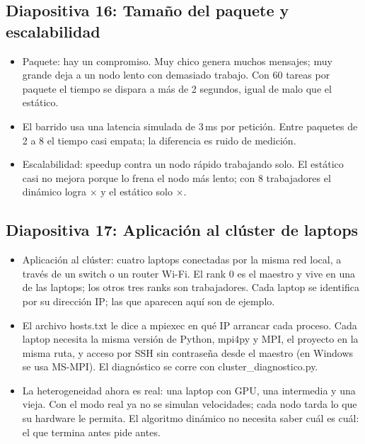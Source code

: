 \documentclass[11pt,a4paper]{article}
\begin{document}
\subsection*{Diapositiva 16: Tamaño del paquete y escalabilidad}
\begin{itemize}
  \item Paquete: hay un compromiso. Muy chico genera muchos mensajes; muy grande deja a un nodo lento con demasiado trabajo. Con 60 tareas por paquete el tiempo se dispara a más de 2 segundos, igual de malo que el estático.
  \item El barrido usa una latencia simulada de 3\,ms por petición. Entre paquetes de 2 a 8 el tiempo casi empata; la diferencia es ruido de medición.
  \item Escalabilidad: speedup contra un nodo rápido trabajando solo. El estático casi no mejora porque lo frena el nodo más lento; con 8 trabajadores el dinámico logra \spDinOcho$\times$ y el estático solo \spEstOcho$\times$.
\end{itemize}

\subsection*{Diapositiva 17: Aplicación al clúster de laptops}
\begin{itemize}
  \item Aplicación al clúster: cuatro laptops conectadas por la misma red local, a través de un switch o un router Wi-Fi. El rank 0 es el maestro y vive en una de las laptops; los otros tres ranks son trabajadores. Cada laptop se identifica por su dirección IP; las que aparecen aquí son de ejemplo.
  \item El archivo hosts.txt le dice a mpiexec en qué IP arrancar cada proceso. Cada laptop necesita la misma versión de Python, mpi4py y MPI, el proyecto en la misma ruta, y acceso por SSH sin contraseña desde el maestro (en Windows se usa MS-MPI). El diagnóstico se corre con cluster\_diagnostico.py.
  \item La heterogeneidad ahora es real: una laptop con GPU, una intermedia y una vieja. Con el modo real ya no se simulan velocidades; cada nodo tarda lo que su hardware le permita. El algoritmo dinámico no necesita saber cuál es cuál: el que termina antes pide antes.
\end{itemize}
\end{document}
